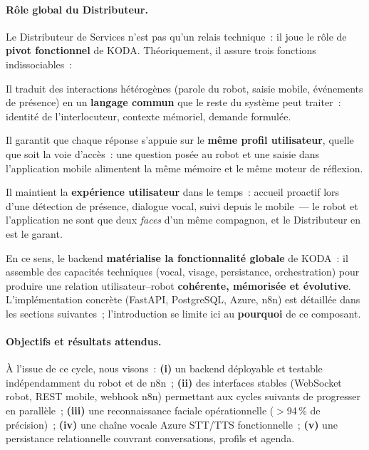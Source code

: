 \documentclass[a4paper,12pt]{report}
\begin{document}
	\paragraph{Rôle global du Distributeur.}
	Le Distributeur de Services n'est pas qu'un relais technique~: il joue le rôle de
	\textbf{pivot fonctionnel} de KODA. Théoriquement, il assure trois fonctions
	indissociables~:
	\begin{description}[leftmargin=!, style=nextline, itemsep=0.35em]
		\item[\textbf{Unification}] Il traduit des interactions hétérogènes (parole du robot,
		saisie mobile, événements de présence) en un \textbf{langage commun} que le reste
		du système peut traiter~: identité de l'interlocuteur, contexte mémoriel, demande
		formulée.
		\item[\textbf{Personnalisation}] Il garantit que chaque réponse s'appuie sur le
		\textbf{même profil utilisateur}, quelle que soit la voie d'accès~: une question
		posée au robot et une saisie dans l'application mobile alimentent la même mémoire
		et le même moteur de réflexion.
		\item[\textbf{Continuité}] Il maintient la \textbf{expérience utilisateur} dans le
		temps~: accueil proactif lors d'une détection de présence, dialogue vocal, suivi
		depuis le mobile~--- le robot et l'application ne sont que deux \emph{faces} d'un
		même compagnon, et le Distributeur en est le garant.
	\end{description}
	En ce sens, le backend \textbf{matérialise la fonctionnalité globale} de KODA~: il
	assemble des capacités techniques (vocal, visage, persistance, orchestration) pour
	produire une relation utilisateur--robot \textbf{cohérente, mémorisée et évolutive}.
	L'implémentation concrète (FastAPI, PostgreSQL, Azure, n8n) est détaillée dans les
	sections suivantes~; l'introduction se limite ici au \textbf{pourquoi} de ce composant.
	
	\paragraph{Objectifs et résultats attendus.}
	À l'issue de ce cycle, nous visons~: \textbf{(i)} un backend déployable et testable
	indépendamment du robot et de n8n~; \textbf{(ii)} des interfaces stables (WebSocket
	robot, REST mobile, webhook n8n) permettant aux cycles suivants de progresser en
	parallèle~; \textbf{(iii)} une reconnaissance faciale opérationnelle ($>$94\,\% de
	précision)~; \textbf{(iv)} une chaîne vocale Azure STT/TTS fonctionnelle~;
	\textbf{(v)} une persistance relationnelle couvrant conversations, profils et agenda.
	
\end{document}
